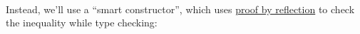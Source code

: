 \begin{fence}
\begin{code}%
\>[0]\AgdaFunction{\AgdaUnderscore{}}\AgdaSpace{}%
\AgdaSymbol{:}\AgdaSpace{}%
\AgdaSpace{}%
\AgdaOperator{\AgdaInductiveConstructor{,}}\AgdaSpace{}%
\AgdaSpace{}%
\AgdaSpace{}%
\AgdaSpace{}%
\AgdaSpace{}%
\AgdaSpace{}%
\AgdaOperator{\AgdaInductiveConstructor{,}}\AgdaSpace{}%
\AgdaSpace{}%
\AgdaSpace{}%
\AgdaSpace{}%
\AgdaOperator{\AgdaInductiveConstructor{,}}\AgdaSpace{}%
\AgdaSpace{}%
\AgdaSpace{}%
\AgdaSpace{}%
\AgdaSpace{}%
\AgdaSpace{}%
\AgdaSpace{}%
\AgdaSpace{}%
\AgdaSpace{}%
\<%
\\
\>[0]\AgdaSymbol{\AgdaUnderscore{}}\AgdaSpace{}%
\AgdaSymbol{=}\AgdaSpace{}%
\AgdaSpace{}%
\AgdaSpace{}%
\AgdaSymbol{(}\AgdaSpace{}%
\AgdaSpace{}%
\AgdaSymbol{)}\<%
\end{code}
\end{fence}

Instead, we'll use a ``smart constructor'', which uses
\protect\hyperlink{Decidable-proof-by-reflection}{proof by reflection}
to check the inequality while type checking:

